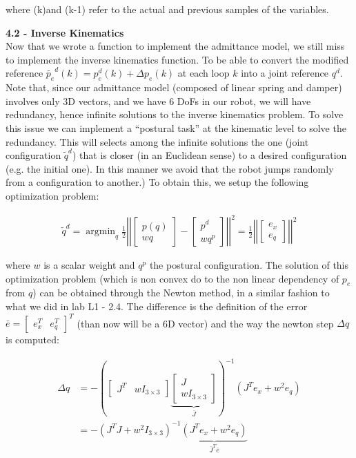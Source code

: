 \documentclass[11pt]{article}
\DeclareMathOperator*{\argmin}{argmin}
\newcommand{\mat}[1]{\ensuremath{\begin{bmatrix}#1\end{bmatrix}}}	%
\begin{document}
where (k)and (k-1) refer to the actual and previous samples of the variables. 


\quad

\noindent
\textbf{4.2 - Inverse Kinematics}\\
Now that we wrote a function to implement the admittance model, we still miss to implement the inverse kinematics function. To be able to convert the modified reference $\tilde{p_e}^d(k) = p_e^d(k) +  \Delta p_e(k)$  at each loop $k$ into a joint reference $q^d$. Note that, since our admittance model (composed of linear spring and damper)  involves only 3D vectors, and we have 6 DoFs in our robot, we will have redundancy, hence  infinite solutions to the inverse kinematics problem. 
To solve this issue we can implement a ``postural task'' at the kinematic level to solve the redundancy.
This will  selects among the infinite solutions the one (joint configuration $\tilde{q}^d$) that is closer (in an Euclidean sense) to a desired configuration (e.g. the initial one). In this manner we avoid that the robot jumps randomly from a configuration to another.) 
To obtain this, we setup the following optimization problem:

\begin{align*}
\tilde{q}^d = \argmin_q \frac{1}{2} \left|\left| \mat{p(q) \\ w q } - \mat{p^d \\ w q^p }   \right|\right|^2 = \frac{1}{2} \left|\left| \mat{ e_x \\ e_q }   \right|\right|^2
\end{align*}

where $w$ is a scalar weight and $q^p$ the postural configuration. The solution of this optimization problem (which is non convex do to the non linear dependency of $p_e$ from $q$) can be obtained through the Newton method, in a similar fashion to what we did in lab L1 - 2.4. The difference is the definition of the error $\bar{e} = \mat{e_x^T & e_q^T}^T$ (than now will be a 6D vector) and the way the newton step $\Delta q$ is computed:


\begin{align*}
\Delta q &= -\left( \mat { J^T &  wI_{3 \times 3} } \underbrace{ \mat{J  \\ wI_{3 \times 3}}}_{\bar{J}} \right)^{-1} \left(J^T e_x + w^2e_q \right) \\
	    &= -\left( J^TJ + w^2I_{3 \times 3}\right)^{-1} \underbrace{ \left(J^T e_x + w^2 e_q \right) }_{\bar{J}^T\bar{e}}
\end{align*}
\end{document}
